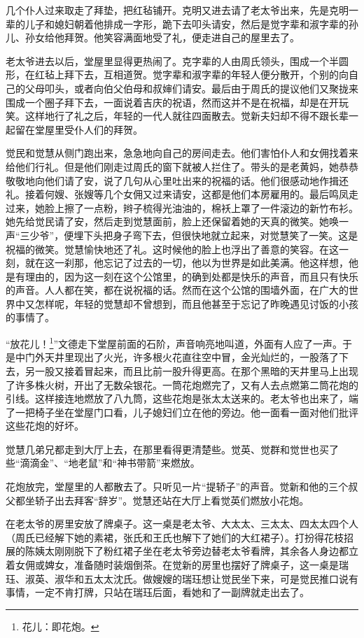 \par 几个仆人过来取走了拜垫，把红毡铺开。克明又进去请了老太爷出来，先是克明一辈的儿子和媳妇朝着他排成一字形，跪下去叩头请安，然后是觉字辈和淑字辈的孙儿、孙女给他拜贺。他笑容满面地受了礼，便走进自己的屋里去了。
\par 老太爷进去以后，堂屋里显得更热闹了。克字辈的人由周氏领头，围成一个半圆形，在红毡上拜下去，互相道贺。觉字辈和淑字辈的年轻人便分散开，个别的向自己的父母叩头，或者向伯父伯母和叔婶们请安。最后由于周氏的提议他们又聚拢来围成一个圈子拜下去，一面说着吉庆的祝语，然而这并不是在祝福，却是在开玩笑。这样地行了礼之后，年轻的一代人就往四面散去。觉新夫妇却不得不跟长辈一起留在堂屋里受仆人们的拜贺。
\par 觉民和觉慧从侧门跑出来，急急地向自己的房间走去。他们害怕仆人和女佣找着来给他们行礼。但是他们刚走过周氏的窗下就被人拦住了。带头的是老黄妈，她恭恭敬敬地向他们请了安，说了几句从心里吐出来的祝福的话。他们很感动地作揖还礼。接着何嫂、张嫂等几个女佣又过来请安，这都是他们本房雇用的。最后鸣凤走过来，她脸上擦了一点粉，辫子梳得光油油的，棉袄上罩了一件滚边的新竹布衫。她先给觉民请了安，然后走到觉慧面前，脸上还保留着她的天真的微笑。她唤一声“三少爷”，便埋下头把身子弯下去，但很快地就立起来，对觉慧笑了一笑。这是祝福的微笑。觉慧愉快地还了礼。这时候他的脸上也浮出了善意的笑容。在这一刻，就在这一刹那，他忘记了过去的一切，他以为世界是如此美满。他这样想，他是有理由的，因为这一刻在这个公馆里，的确到处都是快乐的声音，而且只有快乐的声音。人人都在笑，都在说祝福的话。然而在这个公馆的围墙外面，在广大的世界中又怎样呢，年轻的觉慧却不曾想到，而且他甚至于忘记了昨晚遇见讨饭的小孩的事情了。
\par “放花儿！\footnote{花儿：即花炮。}”文德走下堂屋前面的石阶，声音响亮地叫道，外面有人应了一声。于是中门外天井里现出了火光，许多根火花直往空中冒，金光灿烂的，一股落了下去，另一股又接着冒起来，而且比前一股升得更高。在那个黑暗的天井里马上出现了许多株火树，开出了无数朵银花。一筒花炮燃完了，又有人去点燃第二筒花炮的引线。这样接连地燃放了八九筒，这些花炮是张太太送来的。老太爷也出来了，端了一把椅子坐在堂屋门口看，儿子媳妇们立在他的旁边。他一面看一面对他们批评这些花炮的好坏。
\par 觉慧几弟兄都走到大厅上去，在那里看得更清楚些。觉英、觉群和觉世也买了些“滴滴金”、“地老鼠”和“神书带箭”来燃放。
\par 花炮放完，堂屋里的人都散去了。只听见一片“提轿子”的声音。觉新和他的三个叔父都坐轿子出去拜客“辞岁”。觉慧还站在大厅上看觉英们燃放小花炮。
\par 在老太爷的房里安放了牌桌子。这一桌是老太爷、大太太、三太太、四太太四个人（周氏已经解下她的素裙，张氏和王氏也解下了她们的大红裙子）。打扮得花枝招展的陈姨太刚刚脱下了粉红裙子坐在老太爷旁边替老太爷看牌，其余各人身边都立着女佣或婢女，准备随时装烟倒茶。在觉新的房里也摆好了牌桌子，这一桌是瑞珏、淑英、淑华和五太太沈氏。做嫂嫂的瑞珏想让觉民坐下来，可是觉民推口说有事情，一定不肯打牌，只站在瑞珏后面，看她和了一副牌就走出去了。
